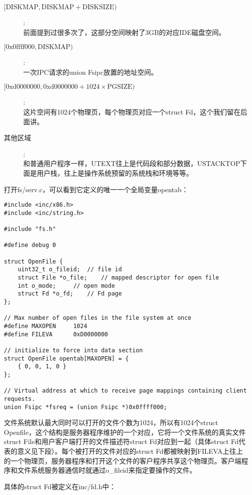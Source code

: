 \documentclass{article}
\begin{document}
\begin{CJK*}{UTF8}{gkai}
\begin{description}
\item[$[\mathrm{DISKMAP}, \mathrm{DISKMAP} + \mathrm{DISKSIZE})$]: \\
前面提到过很多次了，这部分空间映射了3GB的对应IDE磁盘空间。
\item[$[\mathrm{0x0ffff000}, \mathrm{DISKMAP})$]: \\
一次IPC请求的union Fsipc放置的地址空间。
\item[$[\mathrm{0xd0000000}, \mathrm{0xd0000000} + 1024 \times \mathrm{PGSIZE})$]: \\
这片空间有1024个物理页，每个物理页对应一个struct Fd，这个我们留在后面讲。
\item[其他区域]:\\
和普通用户程序一样，UTEXT往上是代码段和部分数据，USTACKTOP下面是用户栈，往上是操作系统预留的系统栈和环境等等。
\end{description}

打开fs/serv.c，可以看到它定义的唯一一个全局变量opentab：

\begin{lstlisting}[style=ccode, title={\scriptsize \ttfamily \bfseries fs/serv.c}]
#include <inc/x86.h>
#include <inc/string.h>

#include "fs.h"

#define debug 0

struct OpenFile {
	uint32_t o_fileid;	// file id
	struct File *o_file;	// mapped descriptor for open file
	int o_mode;		// open mode
	struct Fd *o_fd;	// Fd page
};

// Max number of open files in the file system at once
#define MAXOPEN		1024
#define FILEVA		0xD0000000

// initialize to force into data section
struct OpenFile opentab[MAXOPEN] = {
	{ 0, 0, 1, 0 }
};

// Virtual address at which to receive page mappings containing client requests.
union Fsipc *fsreq = (union Fsipc *)0x0ffff000;
\end{lstlisting}

文件系统默认最大同时可以打开的文件个数为1024，所以有1024个struct Openfile，这个结构是服务器程序维护的一个对应，它将一个文件系统的真实文件struct File和用户客户端打开的文件描述符struct Fd对应到一起（具体struct Fd代表的意义见下段）。每个被打开的文件对应的struct Fd都被映射到FILEVA上往上的一个物理页，服务器程序和打开这个文件的客户程序共享这个物理页。客户端程序和文件系统服务器通信时就通过o\_fileid来指定要操作的文件。

具体的struct Fd被定义在inc/fd.h中：


\end{CJK*}
\end{document}
